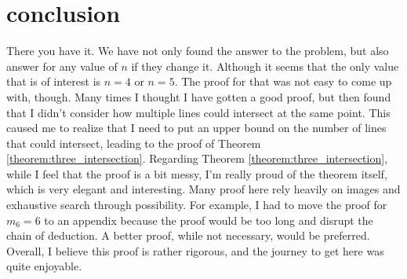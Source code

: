 \documentclass[a4paper, 12pt]{article}
\begin{document}
\clearpage
\section{conclusion}
There you have it. We have not only found the answer to the problem, but also answer for any value of $n$ if they change it. Although it seems that the only value that is of interest is $n=4$ or $n=5$. The proof for that was not easy to come up with, though. Many times I thought I have gotten a good proof, but then found that I didn't consider how multiple lines could intersect at the same point. This caused me to realize that I need to put an upper bound on the number of lines that could intersect, leading to the proof of Theorem \ref{theorem:three_intersection}. Regarding Theorem \ref{theorem:three_intersection}, while I feel  that the proof is a bit messy, I'm really proud of the theorem itself, which is very elegant and interesting. Many proof here rely heavily on images and exhaustive search through possibility. For example, I had to move the proof for $m_6=6$ to an appendix because the proof would be too long and disrupt the chain of deduction. A better proof, while not necessary, would be preferred. 
Overall, I believe this proof is rather rigorous, and the journey to get here was quite enjoyable.

\end{document}
